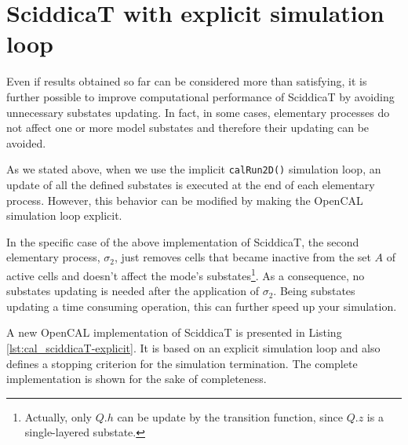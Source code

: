 \section{SciddicaT with explicit simulation loop}
Even if results obtained so far can be considered more than
satisfying, it is further possible to improve computational
performance of SciddicaT by avoiding unnecessary substates
updating. In fact, in some cases, elementary processes do not affect
one or more model substates and therefore their updating can be
avoided.

As we stated above, when we use the implicit \verb'calRun2D()'
simulation loop, an update of all the defined substates is executed at
the end of each elementary process. However, this behavior can be
modified by making the OpenCAL simulation loop explicit.

In the specific case of the above implementation of SciddicaT, the
second elementary process, $\sigma_2$, just removes cells that became
inactive from the set $A$ of active cells and doesn't affect the
mode's substates\footnote{Actually, only $Q.h$ can be update by the
  transition function, since $Q.z$ is a single-layered substate.}. As
a consequence, no substates updating is needed after the application
of $\sigma_2$. Being substates updating a time consuming operation,
this can further speed up your simulation.

A new OpenCAL implementation of SciddicaT is presented in Listing
\ref{lst:cal_sciddicaT-explicit}. It is based on an explicit
simulation loop and also defines a stopping criterion for the
simulation termination. The complete implementation is shown for the
sake of completeness.





